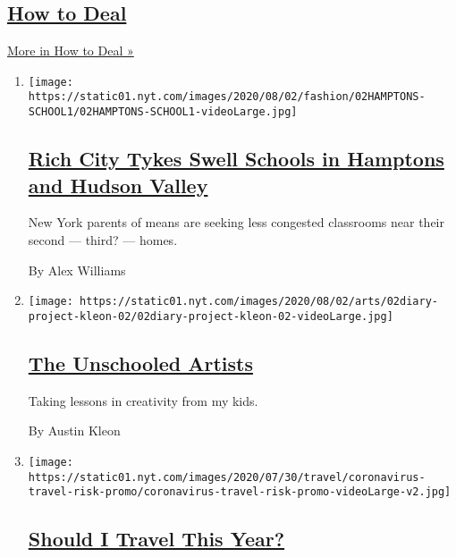 \hypertarget{how-to-deal}{%
\subsection{\texorpdfstring{\href{/spotlight/how-to-deal}{How to
Deal}}{How to Deal}}\label{how-to-deal}}

\href{/spotlight/how-to-deal}{More in How to Deal »}

\begin{enumerate}
\def\labelenumi{\arabic{enumi}.}
\item
  \texttt{[image: https://static01.nyt.com/images/2020/08/02/fashion/02HAMPTONS-SCHOOL1/02HAMPTONS-SCHOOL1-videoLarge.jpg]}

  \hypertarget{rich-city-tykes-swell-schools-in-hamptons-and-hudson-valley}{%
  \subsection{\texorpdfstring{\href{/2020/08/01/style/wealthy-rich-parents-coronavirus-schools-hamptons.html}{Rich
  City Tykes Swell Schools in Hamptons and Hudson
  Valley}}{Rich City Tykes Swell Schools in Hamptons and Hudson Valley}}\label{rich-city-tykes-swell-schools-in-hamptons-and-hudson-valley}}

  New York parents of means are seeking less congested classrooms near
  their second --- third? --- homes.

  By Alex Williams
\item
  \texttt{[image: https://static01.nyt.com/images/2020/08/02/arts/02diary-project-kleon-02/02diary-project-kleon-02-videoLarge.jpg]}

  \hypertarget{the-unschooled-artists}{%
  \subsection{\texorpdfstring{\href{/2020/07/31/arts/quarantine-parenting-art.html}{The
  Unschooled
  Artists}}{The Unschooled Artists}}\label{the-unschooled-artists}}

  Taking lessons in creativity from my kids.

  By Austin Kleon
\item
  \texttt{[image: https://static01.nyt.com/images/2020/07/30/travel/coronavirus-travel-risk-promo/coronavirus-travel-risk-promo-videoLarge-v2.jpg]}

  \hypertarget{should-i-travel-this-year}{%
  \subsection{\texorpdfstring{\href{/interactive/2020/07/31/travel/coronavirus-travel-risk.html}{Should
  I Travel This
  Year?}}{Should I Travel This Year?}}\label{should-i-travel-this-year}}


\end{enumerate}
